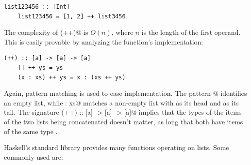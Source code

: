 \documentclass[UdineBachThesis,american,11pt,draft]{PhdThesis}
\begin{document}
  \begin{lstlisting}[gobble=4,basicstyle=\ttfamily\small]
    list123456 :: [Int]
    list123456 = [1, 2] ++ list3456
  \end{lstlisting}

  The complexity of \lstinline@(++)@ is
  $O\mathopen{}\left(n\right)\mathclose{}$, where $n$ is the length of the first
  operand. This is easily provable by analyzing the function's implementation:

  \begin{lstlisting}[gobble=4,basicstyle=\ttfamily\small]
    (++) :: [a] -> [a] -> [a]
    [] ++ ys = ys
    (x : xs) ++ ys = x : (xs ++ ys)
  \end{lstlisting}

  Again, pattern matching is used to ease implementation. The pattern
  \lstinline@[]@ identifies an empty list, while \lstinline@x : xs@ matches a
  non-empty list with \lstinline@x@ as its head and \lstinline@xs@ as its tail.
  The signature \lstinline@(++) :: [a] -> [a] -> [a]@ implies that the types of
  the items of the two lists being concatenated doesn't matter, as long that
  both have items of the same type \lstinline@a@.

  Haskell's standard library provides many functions operating on lists. Some
  commonly used are:
\end{document}
